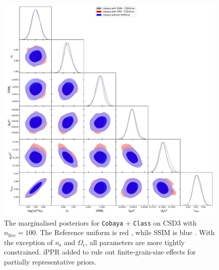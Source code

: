 \documentclass[usenatbib]{mnras}
\begin{document}
\begin{landscape}
\begin{figure}
  \centering %
  \includegraphics[height=\textheight]{./illustrations/cosmology.pdf}
  \caption{The marginalised posteriors for \texttt{Cobaya} +
    \texttt{Class} on CSD3 with \(n_\text{live}=100\). The Reference
    uniform is \color{red} red \color{black}, while SSIM is
    \color{blue} blue \color{black}. With the exception of
    \(n_\mathrm{s}\) and \(\Omega_\mathrm{c}\), all parameters are
    more tightly constrained. iPPR added to rule out finite-grain-size
    effects for partially representative
    priors. } \label{fig:cosmology}
\end{figure}
\end{landscape}
\end{document}
